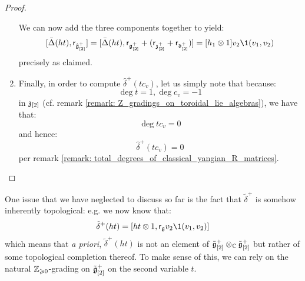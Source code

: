 \begin{proof}
\begin{enumerate}
                    We can now add the three components together to yield:
                        $$[\bar{\Delta}(ht), \sfr_{\hat{\g}_{[2]}^+}] = [ \bar{\Delta}(ht), \sfr_{\g_{[2]}^+} + (\sfr_{\z_{[2]}^+} + \sfr_{\d_{[2]}^+}) ] =  [h_1 \tensor 1] v_2 \1(v_1, v_2)$$
                    precisely as claimed. 
                    
                    \item Finally, in order to compute $\hat{\delta}^+(t c_v)$, let us simply note that because:
                        $$\deg t = 1, \deg c_v = -1$$
                    in $\mathfrak{z}_{[2]}$ (cf. remark \ref{remark: Z_gradings_on_toroidal_lie_algebras}), we have that:
                        $$\deg t c_v = 0$$
                    and hence:
                        $$\hat{\delta}^+(t c_v) = 0$$
                    per remark \ref{remark: total_degrees_of_classical_yangian_R_matrices}.
                \end{enumerate}
            \end{proof}

        One issue that we have neglected to discuss so far is the fact that $\tilde{\delta}^+$ is somehow inherently topological: e.g. we now know that:
            $$\tilde{\delta}^+(ht) = [ht \tensor 1, \sfr_{\g} v_2 \1(v_1, v_2)]$$
        which means that \textit{a priori}, $\tilde{\delta}^+(ht)$ is not an element of $\tilde{\g}_{[2]}^+ \tensor_{\bbC} \tilde{\g}_{[2]}^+$ but rather of some topological completion thereof. To make sense of this, we can rely on the natural $\mathbb{Z}_{\geqslant 0}$-grading on $\tilde{\mathfrak{g}}_{[2]}^+$ on the second variable $t$.


